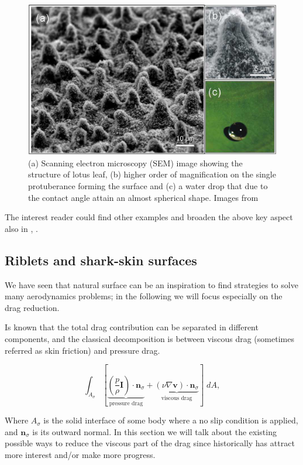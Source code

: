 \begin{figure}[h]
	\centering
	\includegraphics[width=0.6\linewidth]{chapter_1/lotus}
	\caption{(a) Scanning electron microscopy (SEM) image showing the structure of lotus leaf, (b) higher order of magnification on the single protuberance forming the surface and (c) a water drop that due to the contact angle attain an almost spherical shape. Images from \cite{stratakis2009laser}}
	\label{fig:lotus}
\end{figure}


The interest reader could find other examples and broaden the above key aspect also in \cite{bhushan2016biomimetics}, \cite{tropea2012nature}.



\subsection{Riblets and shark-skin surfaces}

We have seen that natural surface can be an inspiration to find strategies to solve many aerodynamics problems; in the following we will focus especially on the drag reduction.

Is known that the total drag contribution can be separated in different components, and the classical decomposition is between viscous drag (sometimes referred as skin friction) and pressure drag.

\begin{equation}
 \int_{A_{\sigma}}  [ \underbrace{\left( \frac{p}{\rho} \mathbf{I} \right) \cdot  \mathbf{n}_{\sigma} }_\text{pressure drag}  +  \underbrace{ \left( \nu \nabla \mathbf{v} \right) \cdot  \mathbf{n}_{\sigma}}_\text{viscous drag} ] \; dA,
 \label{eq:force}
\end{equation}

Where $A_{\sigma}$ is the solid interface of some body where a no slip condition is applied, and $ \mathbf{n}_{\sigma}$ is its outward normal.
In this section we will talk about the existing possible ways to reduce the viscous part of the drag since historically has attract more interest and/or make more progress.

